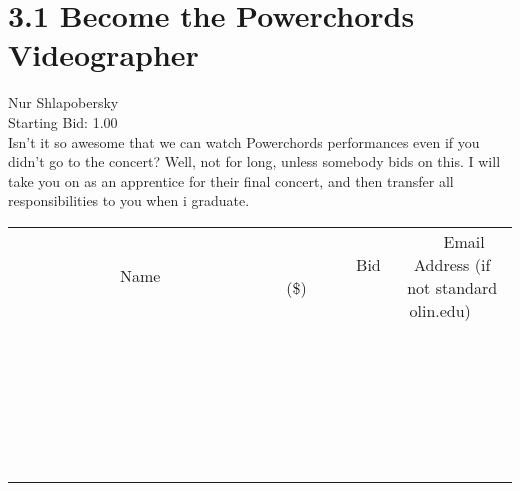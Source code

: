 \documentclass[11pt]{article}
\begin{document}
					\section*{3.1 Become the Powerchords Videographer}
					Nur Shlapobersky \\
					Starting Bid: 1.00 \\
					Isn't it so awesome that we can watch Powerchords performances even if you didn't go to the concert? Well, not for long, unless somebody bids on this. I will take you on as an apprentice for their final concert, and then transfer all responsibilities to you when i graduate. \\
					[6ex]
					\begin{tabular}{c c c}
						~~~~~~~~~~~~~Name~~~~~~~~~~~~~ & ~~~~~~~~~Bid (\$)~~~~~~~~~ & ~~~Email Address (if not standard olin.edu)~~~ \\
				
 & & \\
\hline
 & & \\
\hline
 & & \\
\hline
 & & \\
\hline
 & & \\
\hline
 & & \\
\hline
 & & \\
\hline
 & & \\
\hline
 & & \\
\hline
 & & \\
\hline
 & & \\
\hline
 & & \\
\hline
 & & \\
\hline
 & & \\
\hline
 & & \\
\hline
 & & \\
\hline
 & & \\
\hline
 & & \\
\hline
 & & \\
\hline
 & & \\
\hline
 & & \\
\hline
 & & \\
\hline
 & & \\
\hline
 & & \\
\hline
 & & \\
\hline
 & & \\
\hline
					\end{tabular}
					\clearpage
				
\end{document}
